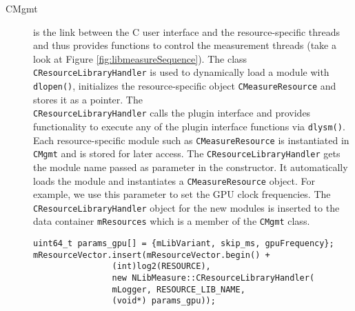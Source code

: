 \begin{description}
\item[CMgmt] is the link between the C user interface and the resource-specific threads and thus provides functions to control the measurement threads (take a look at Figure \ref{fig:libmeasureSequence}). The class \texttt{CResourceLibraryHandler} is used to dynamically load a module with \texttt{dlopen()}, initializes the resource-specific object \texttt{CMeasureResource} and stores it as a pointer. The \\\texttt{CResourceLibraryHandler} calls the plugin interface and provides functionality to execute any of the plugin interface functions via \texttt{dlysm()}. Each resource-specific module such as \texttt{CMeasureResource} is instantiated in \texttt{CMgmt} and is stored for later access. The \texttt{CResourceLibraryHandler} gets the module name passed as parameter in the constructor. It automatically loads the module and instantiates a \texttt{CMeasureResource} object.  For example, we use this parameter to set the GPU clock frequencies. The \texttt{CResourceLibraryHandler} object for the new modules is inserted to the data container \texttt{mResources} which is a member of the \texttt{CMgmt} class.\\
\begin{lstlisting}[caption={Extension to the \texttt{CMgmt} constructor. \added[id=ck]{Listing aktualisiert}}, label=lst:CMgmtExtension]
uint64_t params_gpu[] = {mLibVariant, skip_ms, gpuFrequency};
mResourceVector.insert(mResourceVector.begin() + 
				(int)log2(RESOURCE),
				new NLibMeasure::CResourceLibraryHandler(
				mLogger, RESOURCE_LIB_NAME,
				(void*)	params_gpu));
\end{lstlisting}


\end{description}
